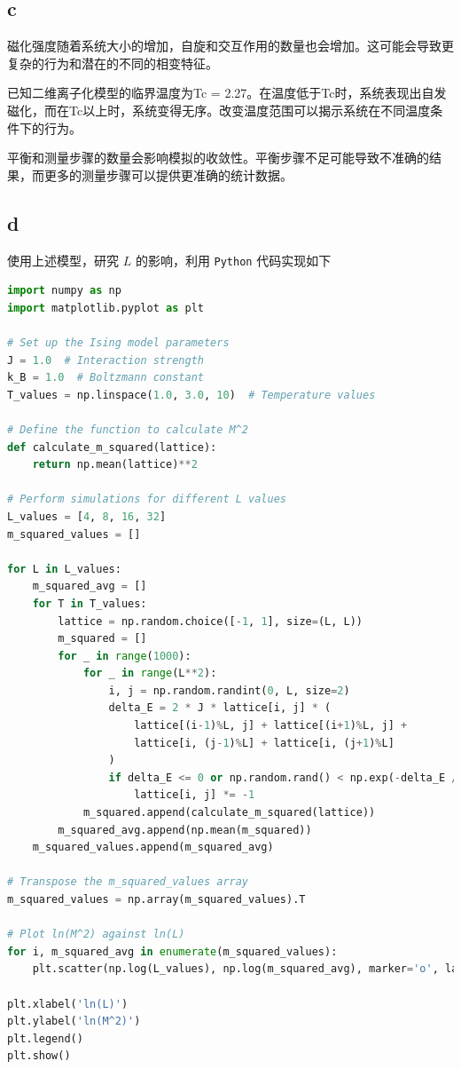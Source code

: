 \documentclass[UTF8]{ctexart}
\begin{document}
    \subsection{c}\label{subsec:4.3}
    磁化强度随着系统大小的增加，自旋和交互作用的数量也会增加。这可能会导致更复杂的行为和潜在的不同的相变特征。

    已知二维离子化模型的临界温度为Tc = 2.27。在温度低于Tc时，系统表现出自发磁化，而在Tc以上时，系统变得无序。改变温度范围可以揭示系统在不同温度条件下的行为。

    平衡和测量步骤的数量会影响模拟的收敛性。平衡步骤不足可能导致不准确的结果，而更多的测量步骤可以提供更准确的统计数据。

    \subsection{d}\label{subsec:4.4}
    使用上述模型，研究 \(L\) 的影响，利用 \texttt{Python} 代码实现如下
    \begin{lstlisting}[language=Python, breaklines = true,label={lst:4.4}]
import numpy as np
import matplotlib.pyplot as plt

# Set up the Ising model parameters
J = 1.0  # Interaction strength
k_B = 1.0  # Boltzmann constant
T_values = np.linspace(1.0, 3.0, 10)  # Temperature values

# Define the function to calculate M^2
def calculate_m_squared(lattice):
    return np.mean(lattice)**2

# Perform simulations for different L values
L_values = [4, 8, 16, 32]
m_squared_values = []

for L in L_values:
    m_squared_avg = []
    for T in T_values:
        lattice = np.random.choice([-1, 1], size=(L, L))
        m_squared = []
        for _ in range(1000):
            for _ in range(L**2):
                i, j = np.random.randint(0, L, size=2)
                delta_E = 2 * J * lattice[i, j] * (
                    lattice[(i-1)%L, j] + lattice[(i+1)%L, j] +
                    lattice[i, (j-1)%L] + lattice[i, (j+1)%L]
                )
                if delta_E <= 0 or np.random.rand() < np.exp(-delta_E / (k_B * T)):
                    lattice[i, j] *= -1
            m_squared.append(calculate_m_squared(lattice))
        m_squared_avg.append(np.mean(m_squared))
    m_squared_values.append(m_squared_avg)

# Transpose the m_squared_values array
m_squared_values = np.array(m_squared_values).T

# Plot ln(M^2) against ln(L)
for i, m_squared_avg in enumerate(m_squared_values):
    plt.scatter(np.log(L_values), np.log(m_squared_avg), marker='o', label="L="+str(L_values[i]))

plt.xlabel('ln(L)')
plt.ylabel('ln(M^2)')
plt.legend()
plt.show()
    \end{lstlisting}
\end{document}
